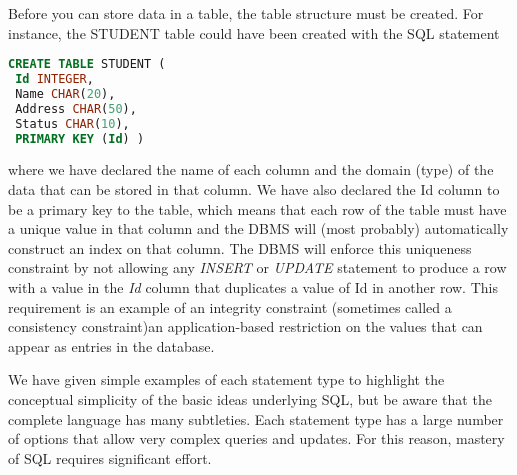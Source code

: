 \documentclass[]{article}
\begin{document}
Before you can store data in a table, the table structure must be
created. For instance, the STUDENT table could have been created with
the SQL statement

\begin{lstlisting}[language=SQL]
CREATE TABLE STUDENT (
 Id INTEGER, 
 Name CHAR(20), 
 Address CHAR(50), 
 Status CHAR(10), 
 PRIMARY KEY (Id) ) 
\end{lstlisting}

where we have declared the name of each column and the domain (type) of
the data that can be stored in that column. We have also declared the Id
column to be a primary key to the table, which means that each row of
the table must have a unique value in that column and the DBMS will
(most probably) automatically construct an index on that column. The
DBMS will enforce this uniqueness constraint by not allowing any
\emph{INSERT} or \emph{UPDATE} statement to produce a row with a value
in the \emph{Id} column that duplicates a value of Id in another row.
This requirement is an example of an integrity constraint (sometimes
called a consistency constraint)an application-based restriction on the
values that can appear as entries in the database.

We have given simple examples of each statement type to highlight the
conceptual simplicity of the basic ideas underlying SQL, but be aware
that the complete language has many subtleties. Each statement type has
a large number of options that allow very complex queries and updates.
For this reason, mastery of SQL requires significant effort.
\end{document}
